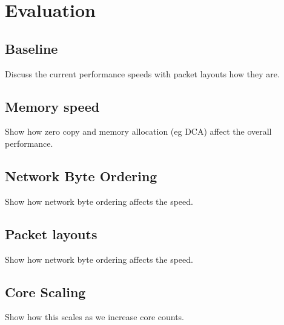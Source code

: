 
\section{Evaluation}
\subsection{Baseline}
Discuss the current performance speeds with packet layouts how they are. 

\subsection{Memory speed}

Show how zero copy and memory allocation (eg DCA) affect the overall performance. 

\subsection{Network Byte Ordering}

Show how network byte ordering affects the speed. 

\subsection{Packet layouts}

Show how network byte ordering affects the speed. 

\subsection{Core Scaling}

Show how this scales as we increase core counts.
